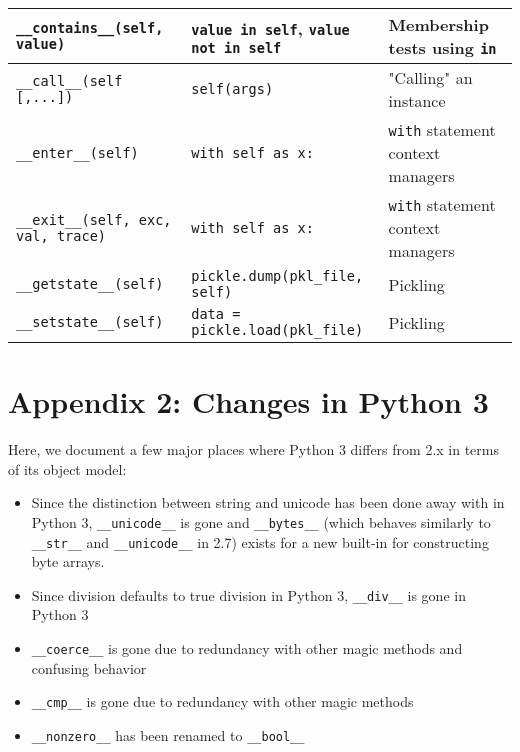 \documentclass[a4paper,11pt]{article}
\newcommand{\code}[1]{\texttt{#1}}
\begin{document}
\begin{center}
\begin{tabular}{| p{5cm} | p{5cm} | p{5cm} |}
\hline
\code{__contains__(self, value)} & \code{value in self}, \code{value not in self} & Membership tests using \code{in}\\
\hline
\code{__call__(self [,...])} & \code{self(args)} & "Calling" an instance\\
\hline
\code{__enter__(self)} & \code{with self as x:} & \code{with} statement context managers\\
\hline
\code{__exit__(self, exc, val, trace)} & \code{with self as x:} & \code{with} statement context managers\\
\hline
\code{__getstate__(self)} & \code{pickle.dump(pkl_file, self)} & Pickling\\
\hline
\code{__setstate__(self)} & \code{data = pickle.load(pkl_file)} & Pickling\\
\hline
\end{tabular}
\end{center}

\section{Appendix 2: Changes in Python 3}

Here, we document a few major places where Python 3 differs from 2.x in terms of its object model:

\begin{itemize}
  \item Since the distinction between string and unicode has been done away with in Python 3, \code{__unicode__} is gone and \code{__bytes__} (which behaves similarly to \code{__str__} and \code{__unicode__} in 2.7) exists for a new built-in for constructing byte arrays.
  \item Since division defaults to true division in Python 3, \code{__div__} is gone in Python 3
  \item \code{__coerce__} is gone due to redundancy with other magic methods and confusing behavior
  \item \code{__cmp__} is gone due to redundancy with other magic methods
  \item \code{__nonzero__} has been renamed to \code{__bool__}
\end{itemize}
\end{document}
